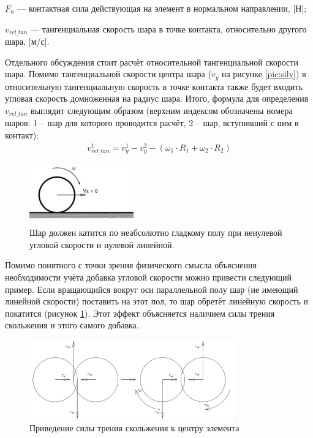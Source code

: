 \documentclass[utf8x, 14pt, oneside, a4paper]{article}
\begin{document}
$F_n$ --- контактная сила действующая на элемент в нормальном направлении, [Н];

$v_{rel\_tan}$ --- тангенциальная скорость шара в точке контакта, относительно другого шара, [м/с].


Отдельного обсуждения стоит расчёт относительной тангенциальной скорости шара. 
Помимо тангенциальной скорости центра шара ($v_y$ на рисунке \ref{pic:sily}) в относительную тангенциальную скорость в точке контакта также будет входить угловая скорость домноженная на радиус шара.
Итого, формула для определения $v_{rel\_tan}$ выглядит следующим образом (верхним индексом обозначены номера шаров: 1 -- шар для которого проводится расчёт, 2 -- шар, вступивший с ним в контакт):
\begin{align}
\label{rel_tan_velocity}
v_{rel\_tan}^{1} = v_{y}^{1} - v_{y}^{2} - \left( \omega_1 \cdot R_1 + \omega_2 \cdot R_2 \right)
\end{align}

\begin{figure}[h!]
	\centering
	\includegraphics[width=0.4\textwidth]{pol_omega}
	\caption{Шар должен катится по неабсолютно гладкому полу при ненулевой угловой скорости и нулевой линейной.}
	\label{pic:pol_omega}
\end{figure} 

Помимо понятного с точки зрения физического смысла объяснения необходимости учёта добавка угловой скорости можно привести следующий пример. 
Если вращающийся вокруг оси параллельной полу шар (не имеющий линейной скорости) поставить на этот пол, то шар обретёт линейную скорость и покатится (рисунок \ref{pic:pol_omega}). 
Этот эффект объясняется наличием силы трения скольжения и этого самого добавка.

\begin{figure}[h!]
	\centering
	\includegraphics[width=0.8\textwidth]{fs_ms}
	\caption{Приведение силы трения скольжения к центру элемента}
	\label{pic:fs_ms}
\end{figure} 
\end{document}
